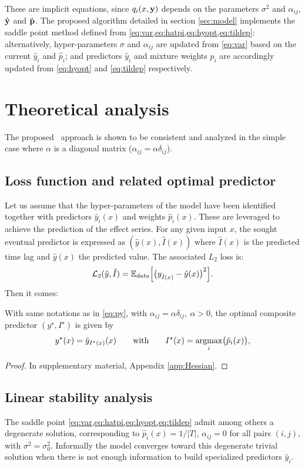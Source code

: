 These are implicit equations, since $q_i(x,{\bf y})$ depends on the parameters $\sigma^2$ and $\alpha_{ij}$, $\hat {\bf y}$ and $\hat{\bf p}$.
The proposed algorithm detailed in section \ref{sec:model} implements the saddle point method defined from \cref{eq:var,eq:hatpi,eq:hyopt,eq:tildep}: 
alternatively, hyper-parameters $\sigma$ and $\alpha_{ij}$ are updated from \cref{eq:var} based on the current $\hat y_i$ and $\hat p_i$; 
and predictors $\hat y_i$ and mixture weights  $\hat p_i$ are accordingly updated from \cref{eq:hyopt} and \cref{eq:tildep} respectively. 

\section{Theoretical analysis}\label{sec-theory}
The proposed \XX\ approach is shown to be consistent and analyzed in the simple case  where $\alpha$ is a diagonal matrix ($\alpha_{ij} = \alpha\delta_{ij}$).

\subsection{Loss function and related optimal predictor}\label{sec:prop}
Let us assume that the hyper-parameters of the model have been identified together with predictors $\hat  y_i(x)$ and weights $\hat p_i(x)$. These are leveraged to achieve the prediction of the effect series. 
For any given input $x$, the sought eventual predictor is expressed as $(\hat y(x),\hat I(x))$ where $\hat I(x)$ is the predicted time lag %
and $\hat y(x)$ the 
predicted value. The associated $L_2$ loss is: 
\begin{equation}\label{eq:orloss}
{\cal L}_2(\hat y,\hat I) = {\mathbb E}_{data}\Bigl[\bigl(y_{\hat I(x)}-\hat y(x)\bigr)^2\Bigr]. 
\end{equation}
Then it comes:
\begin{prop}\label{prop:opred}
With same notations as in \cref{eq:py}, with $\alpha_{ij} = \alpha\delta_{ij},\ \alpha>0$, the optimal composite predictor 
$(y^\star,I^\star)$ is given by
\[
y^\star(x) = \hat y_{I^\star(x)}(x)\qquad\text{with}\qquad I^\star(x) = \operatorname*{argmax}_{i} \bigl(\hat p_i(x)\bigr), 
\]
\end{prop}
\begin{proof}
In supplementary material, Appendix \ref{app:Hessian}.
\end{proof}

\subsection{Linear stability analysis}\label{sec:stability}
The saddle point \cref{eq:var,eq:hatpi,eq:hyopt,eq:tildep} admit among others a degenerate solution, corresponding 
to $\hat p_i(x) = 1/\vert T\vert$, $\alpha_{ij}=0$ for all pairs $(i,j)$, with $\sigma^2=\sigma_0^2$. Informally the model converges toward this degenerate trivial solution when there is not enough information to build specialized predictors $\hat y_i$. 

